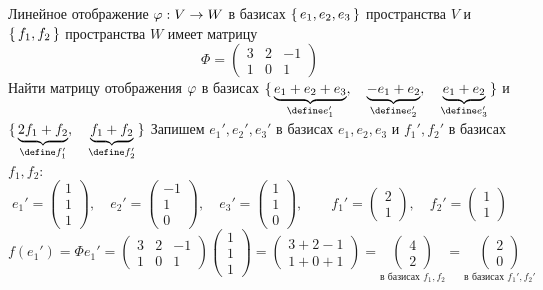 Линейное отображение $ \varphi : V \to W $ в базисах $ \set{e_1, e_2, e_3} $ пространства $ V $ и $ \set{f_1, f_2} $ пространства $ W $ имеет матрицу
$$ \Phi =
\begin{pmatrix}
	3 & 2 & -1 \\
    1 & 0 & 1
\end{pmatrix} $$
Найти матрицу отображения $ \varphi $ в базисах $ \set{\underbrace{e_1 + e_2 + e_3}_{\define e_1'}, \quad \underbrace{-e_1 + e_2}_{\define e_2'}, \quad \underbrace{e_1 + e_2}_{\define e_3'}} $ и $ \set{\underbrace{2f_1 + f_2}_{\define f_1'}, \quad \underbrace{f_1 + f_2}_{\define f_2'}} $
Запишем $ e_1', e_2', e_3' $ в базисах $ e_1, e_2, e_3 $ и $ f_1', f_2' $ в базисах $ f_1, f_2 $:
$$ e_1' =
\begin{pmatrix}
	1 \\
    1 \\
    1
\end{pmatrix}, \quad e_2' =
\begin{pmatrix}
	-1 \\
    1 \\
    0
\end{pmatrix}, \quad e_3' =
\begin{pmatrix}
	1 \\
    1 \\
    0
\end{pmatrix}, \qquad f_1' =
\begin{pmatrix}
	2 \\
    1
\end{pmatrix}, \quad f_2' =
\begin{pmatrix}
	1 \\
    1
\end{pmatrix} $$
$$ f(e_1') = \Phi e_1' =
\begin{pmatrix}
	3 & 2 & -1 \\
    1 & 0 & 1
\end{pmatrix}
\begin{pmatrix}
	1 \\
    1 \\
    1
\end{pmatrix} =
\begin{pmatrix}
	3 + 2 - 1 \\
    1 + 0 + 1
\end{pmatrix} = \underset{\text{в базисах } f_1, f_2}{
    \begin{pmatrix}
        4 \\
        2
    \end{pmatrix}} = \underset{\text{в базисах } f_1', f_2'}{
    \begin{pmatrix}
        2 \\
        0
    \end{pmatrix}} $$
